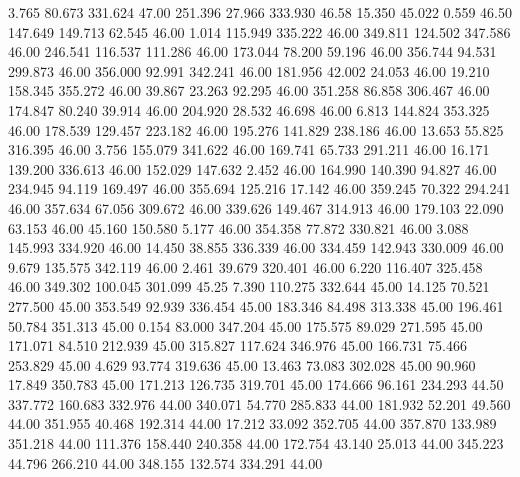    3.765   80.673  331.624        47.00
 251.396   27.966  333.930        46.58
  15.350   45.022    0.559        46.50
 147.649  149.713   62.545        46.00
   1.014  115.949  335.222        46.00
 349.811  124.502  347.586        46.00
 246.541  116.537  111.286        46.00
 173.044   78.200   59.196        46.00
 356.744   94.531  299.873        46.00
 356.000   92.991  342.241        46.00
 181.956   42.002   24.053        46.00
  19.210  158.345  355.272        46.00
  39.867   23.263   92.295        46.00
 351.258   86.858  306.467        46.00
 174.847   80.240   39.914        46.00
 204.920   28.532   46.698        46.00
   6.813  144.824  353.325        46.00
 178.539  129.457  223.182        46.00
 195.276  141.829  238.186        46.00
  13.653   55.825  316.395        46.00
   3.756  155.079  341.622        46.00
 169.741   65.733  291.211        46.00
  16.171  139.200  336.613        46.00
 152.029  147.632    2.452        46.00
 164.990  140.390   94.827        46.00
 234.945   94.119  169.497        46.00
 355.694  125.216   17.142        46.00
 359.245   70.322  294.241        46.00
 357.634   67.056  309.672        46.00
 339.626  149.467  314.913        46.00
 179.103   22.090   63.153        46.00
  45.160  150.580    5.177        46.00
 354.358   77.872  330.821        46.00
   3.088  145.993  334.920        46.00
  14.450   38.855  336.339        46.00
 334.459  142.943  330.009        46.00
   9.679  135.575  342.119        46.00
   2.461   39.679  320.401        46.00
   6.220  116.407  325.458        46.00
 349.302  100.045  301.099        45.25
   7.390  110.275  332.644        45.00
  14.125   70.521  277.500        45.00
 353.549   92.939  336.454        45.00
 183.346   84.498  313.338        45.00
 196.461   50.784  351.313        45.00
   0.154   83.000  347.204        45.00
 175.575   89.029  271.595        45.00
 171.071   84.510  212.939        45.00
 315.827  117.624  346.976        45.00
 166.731   75.466  253.829        45.00
   4.629   93.774  319.636        45.00
  13.463   73.083  302.028        45.00
  90.960   17.849  350.783        45.00
 171.213  126.735  319.701        45.00
 174.666   96.161  234.293        44.50
 337.772  160.683  332.976        44.00
 340.071   54.770  285.833        44.00
 181.932   52.201   49.560        44.00
 351.955   40.468  192.314        44.00
  17.212   33.092  352.705        44.00
 357.870  133.989  351.218        44.00
 111.376  158.440  240.358        44.00
 172.754   43.140   25.013        44.00
 345.223   44.796  266.210        44.00
 348.155  132.574  334.291        44.00
